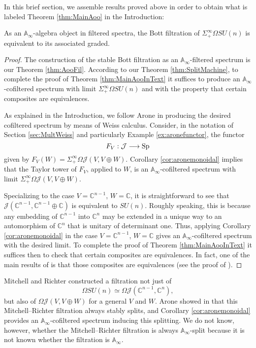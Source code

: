 In this brief section, we assemble results proved above in order to obtain what is labeled Theorem \ref{thm:MainAoo} in the Introduction:

\begin{thm} \label{thm:MainAooInText}
As an $\mathbb{A}_\infty$-algebra object in filtered spectra, the Bott filtration of $\Sigma^{\infty}_+ \Omega SU(n)$ is equivalent to its associated graded.
\end{thm}

\begin{proof}
The construction of the stable Bott filtration as an $\mathbb{A}_\infty$-filtered spectrum is our Theorem \ref{thm:AooFil}.  According to our Theorem \ref{thm:SplitMachine}, to complete the proof of Theorem \ref{thm:MainAooInText} it suffices to produce an $\mathbb{A}_\infty$-cofiltered spectrum with limit $\Sigma^{\infty}_+ \Omega SU(n)$ and with the property that certain composites are equivalences.

As explained in the Introduction, we follow Arone \cite{Arone} in producing the desired cofiltered spectrum by means of Weiss calculus.  Consider, in the notation of Section \ref{sec:MultWeiss} and particularly Example \ref{ex:aronefunctor}, the functor $$F_V:\mathcal{J} \longrightarrow \operatorname{\mathrm{Sp}}$$ given by $F_V(W) = \Sigma^{\infty}_+ \Omega \mathcal{J}(V, V \oplus W)$.  Corollary \ref{cor:aronemonoidal} implies that the Taylor tower of $F_V$, applied to $W$, is an $\mathbb{A}_\infty$-cofiltered spectrum with limit $\Sigma^{\infty}_+ \Omega \mathcal{J}(V,V \oplus W)$.

Specializing to the case $V=\mathbb{C}^{n-1}$, $W=\mathbb{C}$, it is straightforward to see that $\mathcal{J}(\mathbb{C}^{n-1},\mathbb{C}^{n-1} \oplus \mathbb{C})$ is equivalent to $SU(n)$.  Roughly speaking, this is because any embedding of $\mathbb{C}^{n-1}$ into $\mathbb{C}^n$ may be extended in a unique way to an automorphism of $\mathbb{C}^n$ that is unitary of determinant one.  Thus, applying Corollary \ref{cor:aronemonoidal} in the case $V=\mathbb{C}^{n-1}$, $W=\mathbb{C}$ gives an $\mathbb{A}_\infty$-cofiltered spectrum with the desired limit.  To complete the proof of Theorem \ref{thm:MainAooInText} it suffices then to check that certain composites are equivalences.  In fact, one of the main results of \cite{Arone} is that those composites are equivalences (see the proof of \cite[Theorem 1.2]{Arone}).
\end{proof}

\begin{rmk}
Mitchell and Richter constructed \cite{CrabbBarcelona} a filtration not just of $$\Omega SU(n) \simeq \Omega \mathcal{J}(\mathbb{C}^{n-1},\mathbb{C}^n),$$ but also of $\Omega \mathcal{J}(V,V\oplus W)$ for a general $V$ and $W$.  Arone showed in \cite[Theorem 1.2]{Arone} that this Mitchell--Richter filtration always stably splits, and Corollary \ref{cor:aronemonoidal} provides an $\mathbb{A}_\infty$-cofiltered spectrum inducing this splitting.  We do not know, however, whether the Mitchell--Richter filtration is always $\mathbb{A}_\infty$-split because it is not known whether the filtration is $\mathbb{A}_\infty$.   
\end{rmk}